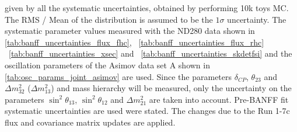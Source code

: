 \begin{table}[htb]
{ given by all the systematic uncertainties, obtained by performing 10k toys MC.
The RMS / Mean of the distribution is assumed to be the $1\sigma$ uncertainty.
The systematic parameter values measured with the ND280 data 
shown in 
\cref{tab:banff_uncertainties_flux_fhc},
~\ref{tab:banff_uncertainties_flux_rhc}
~\ref{tab:banff_uncertainties_xsec}
and
~\ref{tab:banff_uncertainties_skdetfsi}
and the oscillation parameters of the Asimov data set A shown in \cref{tab:osc_params_joint_asimov}
are used.
Since the parameters $\delta_{CP}$, $\theta_{23}$ and $\Delta m^2_{32}$ ($\Delta m^2_{13}$) and mass hierarchy
will be measured,
only the uncertainty on the parameters 
$\sin^2 \theta_{13}$,
$\sin^2 \theta_{12}$
and 
$\Delta m^2_{21}$ 
are taken into account.
Pre-BANFF fit systematic uncertainties are used were stated.
The changes due to the Run 1-7c flux and covariance matrix updates are applied.
}                                                                                                                                                                                          
\label{tab:nsk_systematic_table_summary_joint_asimov_A_rhc_elike_Run17c}
\end{table}



 


